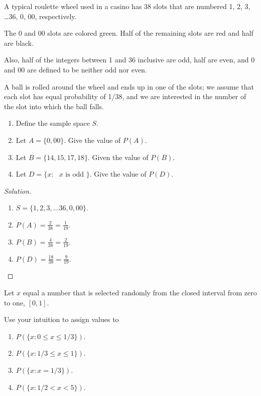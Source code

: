 \documentclass[class=probandstats,crop=false]{standalone}
\begin{document}
\begin{exercise}
    \par A typical roulette wheel used in a casino has 38 slots that are numbered 1, 2, 3, \ldots 36, 0, 00, respectively.
    \par The 0 and 00 slots are colored green. Half of the remaining slots are red and half are black.
    \par Also, half of the integers between 1 and 36 inclusive are odd, half are even, and 0 and 00 are defined to be neither odd nor even.
    \par A ball is rolled around the wheel and ends up in one of the slots; we assume that each slot has equal probability of 1/38, and we are interested in the number of the slot into which the ball falls.
    \begin{enumerate}[label = \textbf{(\alph*)}]
        \item Define the sample space $S$.
        \item Let $A = \{0, 00\}$. Give the value of $P(A)$.
        \item Let $B = \{ 14, 15, 17, 18 \}$. Given the value of $P(B)$.
        \item Let $D = \{ x : \text{ $x$ is odd } \}$. Give the value of $P(D)$.
    \end{enumerate}
\end{exercise}

\begin{proof}[Solution]
    \begin{enumerate}[label = \textbf{(\alph*)}]
        \item $S = \{ 1, 2, 3, \ldots 36, 0, 00 \}$.
        \item $P(A) = \frac{2}{38} = \frac{1}{19}$.
        \item $P(B) = \frac{4}{38} = \frac{2}{19}$.
        \item $P(D) = \frac{18}{38} = \frac{9}{19}$.
    \end{enumerate}
\end{proof}

\begin{exercise}
    \par Let $x$ equal a number that is selected randomly from the closed interval from zero to one, $[0, 1]$.
    \par Use your intuition to assign values to
    \begin{enumerate}[label = \textbf{(\alph*)}]
        \item $P(\{ x: 0\le x\le 1/3 \})$.
        \item $P(\{ x: 1/3\le x\le 1 \})$.
        \item $P(\{ x: x = 1/3 \})$.
        \item $P(\{ x: 1/2 < x < 5 \})$.
    \end{enumerate}
\end{exercise}
\end{document}
